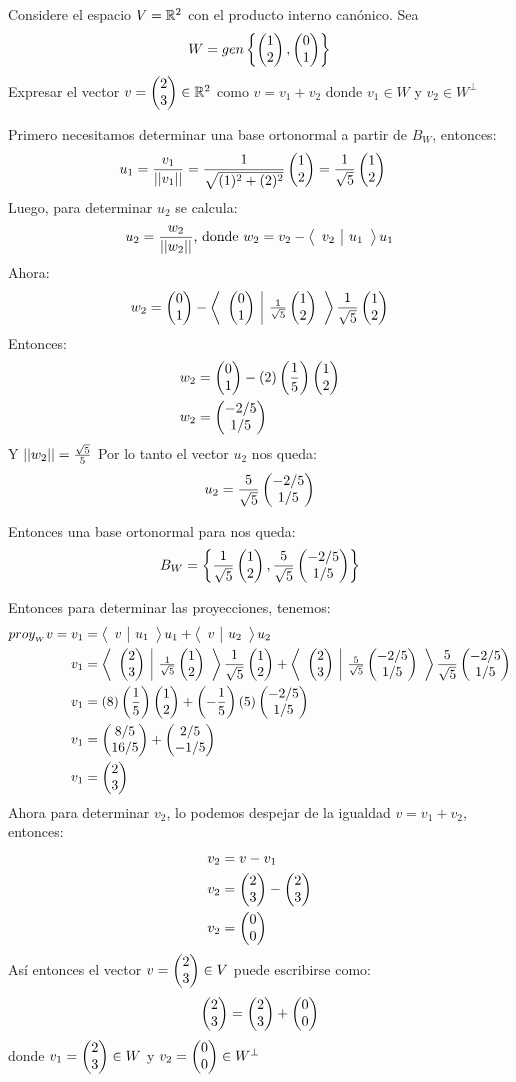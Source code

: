 \begin{ejemplo}
    Considere el espacio $V = \rdos$ con el producto interno canónico. Sea 
    $$W = gen\llav{\vectrdos{1}{2}, \vectrdos{0}{1}}$$
    Expresar el vector $v = \vectrdos{2}{3} \in \rdos$ como $v = v_1 + v_2$ donde $v_1 \in W$ y $v_2 \in W^\perp$
\end{ejemplo}
\begin{sol}
Primero necesitamos determinar una base ortonormal a partir de $B_W$, entonces:
\begin{align*}
    u_1 &= \frac{v_1}{\norm{v_1}} = \frac{1}{\sqrt{(1)^2 + (2)^2}}\vectrdos{1}{2} = \frac{1}{\sqrt{5}}\vectrdos{1}{2}
\end{align*}
Luego, para determinar $u_2$ se calcula:
$$u_2 = \frac{w_2}{\norm{w_2}} \text{, donde $w_2 = v_2 - \prodInt{v_2}{u_1}u_1$}$$
Ahora:
$$w_2 = \vectrdos{0}{1} - \prodInt{\vectrdos{0}{1}}{\frac{1}{\sqrt{5}}\vectrdos{1}{2}}\frac{1}{\sqrt{5}}\vectrdos{1}{2}$$
Entonces:
\begin{align*}
    w_2 &= \vectrdos{0}{1} - (2)\left(\frac{1}{5}\right)\vectrdos{1}{2}\\
    w_2 &= \vectrdos{- 2/5}{1/5}
\end{align*}
Y $\norm{w_2} = \frac{\sqrt{5}}{5}$
Por lo tanto el vector $u_2$ nos queda:
$$u_2 = \frac{5}{\sqrt{5}}\vectrdos{-2/5}{1/5}$$

Entonces una base ortonormal para \rdos nos queda:
$$B_W = \llav{ \frac{1}{\sqrt{5}}\vectrdos{1}{2},\frac{5}{\sqrt{5}}\vectrdos{-2/5}{1/5}}$$

Entonces para determinar las proyecciones, tenemos:
\begin{align*}
    proy_{_W}v = v_1 &= \prodInt{v}{u_1}u_1 + \prodInt{v}{u_2}u_2\\
    v_1 &= \prodInt{\vectrdos{2}{3}}{\frac{1}{\sqrt{5}}\vectrdos{1}{2}}\frac{1}{\sqrt{5}}\vectrdos{1}{2} + \prodInt{\vectrdos{2}{3}}{\frac{5}{\sqrt{5}}\vectrdos{-2/5}{1/5}}\frac{5}{\sqrt{5}}\vectrdos{-2/5}{1/5}\\
    v_1 &= (8) \left( \frac{1}{5} \right) \vectrdos{1}{2} + \left(-\frac{1}{5}\right) (5) \vectrdos{-2/5}{1/5}\\
    v_1 &= \vectrdos{8/5}{16/5} + \vectrdos{2/5}{-1/5}\\
    v_1 &= \vectrdos{2}{3}
\end{align*}
Ahora para determinar $v_2$, lo podemos despejar de la igualdad $v = v_1 + v_2$, entonces:
\begin{align*}
    v_2 &= v - v_1\\
    v_2 &= \vectrdos{2}{3} - \vectrdos{2}{3}\\
    v_2 &= \vectrdos{0}{0}
\end{align*}
Así entonces el vector $v = \vectrdos{2}{3} \in V$ puede escribirse como:
$$\vectrdos{2}{3} = \vectrdos{2}{3} + \vectrdos{0}{0}$$
donde $v_1 = \vectrdos{2}{3} \in W$ y $v_2 = \vectrdos{0}{0} \in W^\perp$
\end{sol}

